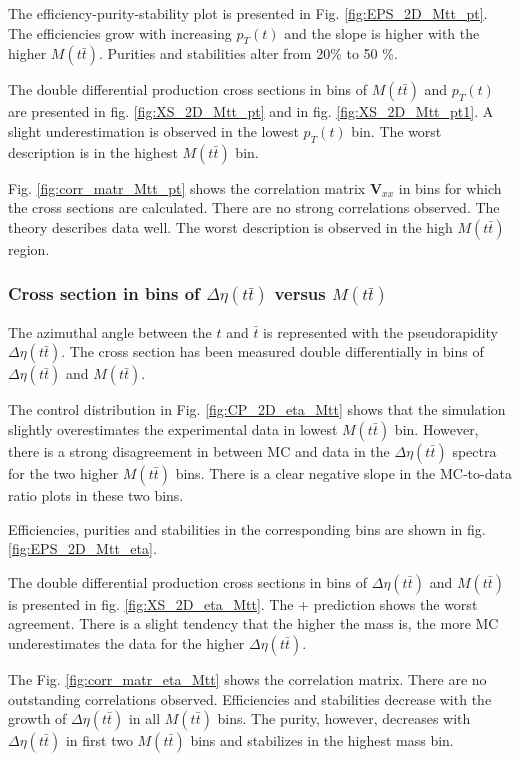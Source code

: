 The efficiency-purity-stability plot is presented in Fig. \ref{fig:EPS_2D_Mtt_pt}. The efficiencies grow with increasing $p_{T}(t)$ and the slope is higher with
the higher $M(t\bar{t})$. Purities and stabilities alter from 20\% to 50 \%.

The double differential production cross sections in bins of $M(t\bar{t})$ and $p_{T}(t)$ are presented in fig. \ref{fig:XS_2D_Mtt_pt} and in fig. \ref{fig:XS_2D_Mtt_pt1}. A slight underestimation is 
observed in the lowest $p_{T}(t)$ bin. The worst description is in the highest $M(t\bar{t})$ bin.

Fig. \ref{fig:corr_matr_Mtt_pt} shows the correlation matrix $\mathbf{V}_{xx}$ in bins for which the cross sections are calculated. There are no strong correlations
observed. The theory describes data well. The worst description is observed in the high $M(t\bar{t})$ region.

\subsubsection{Cross section in bins of $\Delta\eta(t\bar{t})$ versus $M(t\bar{t})$}

The azimuthal angle between the $t$ and $\bar{t}$ is represented with the pseudorapidity $\Delta\eta(t\bar{t})$. The cross section has been measured
double differentially in bins of $\Delta\eta(t\bar{t})$ and $M(t\bar{t})$.

The control distribution in Fig. \ref{fig:CP_2D_eta_Mtt} shows that the simulation slightly overestimates the experimental data in lowest $M(t\bar{t})$
bin. However, there is a strong disagreement in between MC and data in the $\Delta\eta(t\bar{t})$ spectra for the two higher $M(t\bar{t})$ bins. There is a 
clear negative slope in the MC-to-data ratio plots in these two bins.

Efficiencies, purities and stabilities in the corresponding bins are shown in fig. \ref{fig:EPS_2D_Mtt_eta}.

The double differential production cross sections in bins of $\Delta\eta(t\bar{t})$ and $M(t\bar{t})$ is presented in fig. \ref{fig:XS_2D_eta_Mtt}. The \MG + \PYTHIA
prediction shows the worst agreement. There is a slight tendency that the higher the mass is, the more MC underestimates the data for the higher $\Delta\eta(t\bar{t})$.

The Fig. \ref{fig:corr_matr_eta_Mtt} shows the correlation matrix. There are no outstanding correlations observed. Efficiencies and stabilities decrease with the
growth of $\Delta\eta(t\bar{t})$ in all $M(t\bar{t})$ bins. The purity, however, decreases with $\Delta\eta(t\bar{t})$ in first two $M(t\bar{t})$ bins and stabilizes
in the highest mass bin.

